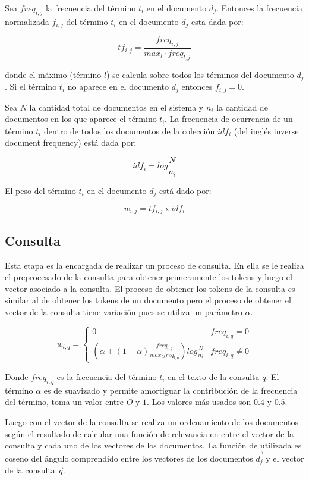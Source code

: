 \documentclass[runningheads,a4paper]{llncs}
\begin{document}
Sea $freq_{i,j}$ la frecuencia del término $t_i$ en el documento $d_j$. Entonces la frecuencia normalizada $f_{i,j}$ del término $t_i$ en el documento $d_j$ esta dada por:

$$ tf_{i,j} = \frac{freq_{i,j}}{max_l \cdot freq_{l,j}} $$

donde el máximo (término $l$) se calcula sobre todos los términos del documento $d_j$. Si el término $t_i$ no aparece en el documento $d_j$ entonces $f_{i,j} = 0$.

Sea $N$ la cantidad total de documentos en el sistema y $n_i$ la cantidad de
documentos en los que aparece el término $t_ị$. La frecuencia de ocurrencia
de un término $t_i$ dentro de todos los documentos de la colección $idf_i$ (del
inglés inverse document frequency) está dada por:

$$ idf_i = log\frac{N}{n_i} $$

El peso del término $t_i$ en el documento $d_j$ está dado por:

$$ w_{i,j} = tf_{i,j}\ \text{x}\ idf_i $$


\subsection{Consulta}

Esta etapa es la encargada de realizar un proceso de consulta. En ella se le realiza el preprocesado de la consulta para obtener primeramente los tokens y luego el vector asociado a la consulta. El proceso de obtener los tokens de la consulta es similar al de obtener los tokens de un documento pero el proceso de obtener el vector de la consulta tiene variación pues se utiliza un parámetro $\alpha$.

\[

w_{i,q} = 
    \begin{cases}
        0 & freq_{i,q} = 0 \\
        \left( \alpha + (1 - \alpha) \frac{freq_{i,q}}{max_l freq_{l,q}} \right) log \frac{N}{n_i} & freq_{i,q} \neq 0
    \end{cases}

\]

Donde $freq_{i,q}$ es la frecuencia del término $t_i$ en el texto de la consulta $q$. El término $\alpha$ es de suavizado y permite amortiguar la contribución de la frecuencia del término, toma un valor entre $O$ y $1$. Los valores más usados son $0.4$ y $0.5$.

Luego con el vector de la consulta se realiza un ordenamiento de los documentos según el resultado de calcular una función de relevancia en entre el vector de la consulta y cada uno de los vectores de los documentos. La función de utilizada es coseno del ángulo comprendido entre los vectores de los documentos $\vec{d_j}$ y el vector de la consulta $\vec{q}$.
\end{document}
